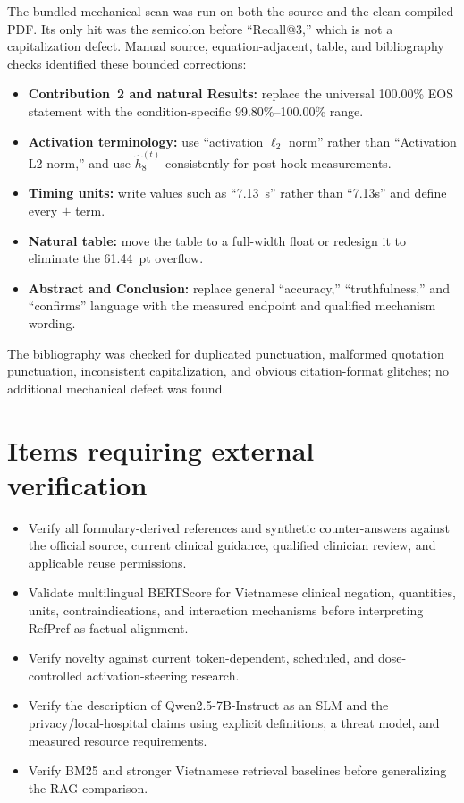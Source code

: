 \documentclass[11pt]{article}
\begin{document}
The bundled mechanical scan was run on both the source and the clean compiled PDF.  Its only hit was the semicolon before ``Recall@3,'' which is not a capitalization defect.  Manual source, equation-adjacent, table, and bibliography checks identified these bounded corrections:

\begin{itemize}
    \item \textbf{Contribution~2 and natural Results:} replace the universal 100.00\% EOS statement with the condition-specific 99.80\%--100.00\% range.
    \item \textbf{Activation terminology:} use ``activation $\ell_2$ norm'' rather than ``Activation L2 norm,'' and use $\hat h_8^{(t)}$ consistently for post-hook measurements.
    \item \textbf{Timing units:} write values such as ``7.13~s'' rather than ``7.13s'' and define every $\pm$ term.
    \item \textbf{Natural table:} move the table to a full-width float or redesign it to eliminate the 61.44~pt overflow.
    \item \textbf{Abstract and Conclusion:} replace general ``accuracy,'' ``truthfulness,'' and ``confirms'' language with the measured endpoint and qualified mechanism wording.
\end{itemize}

The bibliography was checked for duplicated punctuation, malformed quotation punctuation, inconsistent capitalization, and obvious citation-format glitches; no additional mechanical defect was found.

\section*{Items requiring external verification}

\begin{itemize}
    \item Verify all formulary-derived references and synthetic counter-answers against the official source, current clinical guidance, qualified clinician review, and applicable reuse permissions.
    \item Validate multilingual BERTScore for Vietnamese clinical negation, quantities, units, contraindications, and interaction mechanisms before interpreting RefPref as factual alignment.
    \item Verify novelty against current token-dependent, scheduled, and dose-controlled activation-steering research.
    \item Verify the description of Qwen2.5-7B-Instruct as an SLM and the privacy/local-hospital claims using explicit definitions, a threat model, and measured resource requirements.
    \item Verify BM25 and stronger Vietnamese retrieval baselines before generalizing the RAG comparison.
\end{itemize}
\end{document}
